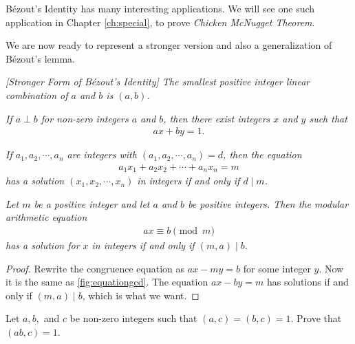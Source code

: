 \documentclass{subfile}
\begin{document}
	B\'{e}zout's Identity has many interesting applications. We will see one such application in Chapter \ref{ch:special}, to prove \textit{Chicken McNugget Theorem}.

	We are now ready to represent a stronger version and also a generalization of B\'{e}zout's lemma.

	\begin{corollary} \slshape  [Stronger Form of B\'{e}zout's Identity]\label{cor:strongbezout}
		The smallest positive integer linear combination of $a$ and $b$ is $(a,b)$.
	\end{corollary}

	\begin{corollary} \slshape \label{cor:bezoutcoprime}
		If $a \perp b$ for non-zero integers $a$ and $b$, then there exist integers $x$ and $y$ such that
		\begin{align*}
		ax+by=1.
		\end{align*}
	\end{corollary}

	\begin{theorem}  \slshape
		If $a_1, a_2, \cdots, a_n$ are integers with $(a_1, a_2, \cdots, a_n)=d$, then the equation
		\begin{align*}
		a_1x_1 + a_2x_2 + \cdots + a_n x_n = m
		\end{align*}
		has a solution $(x_1, x_2, \cdots, x_n)$ in integers if and only if $d\mid m$.
	\end{theorem}

	\begin{theorem}\slshape\label{thm:ax=b}
		Let $m$ be a positive integer and let $a$ and $b$ be positive integers. Then the modular arithmetic equation
		\begin{align*} ax \equiv b \pmod m\end{align*}
		has a solution for $x$ in integers if and only if $(m,a)\mid b$.
	\end{theorem}

	\begin{proof}
		Rewrite the congruence equation as $ax-my = b$ for some integer $y$. Now it is the same as \autoref{fig:equationgcd}. The equation $ax-by=m$ has solutions if and only if $(m,a)\mid b$, which is what we want.
	\end{proof}

	\begin{problem}
		Let $a,b,$ and $c$ be non-zero integers such that $(a, c)=(b,c)=1$. Prove that $(ab,c)=1$.
	\end{problem}
\end{document}
